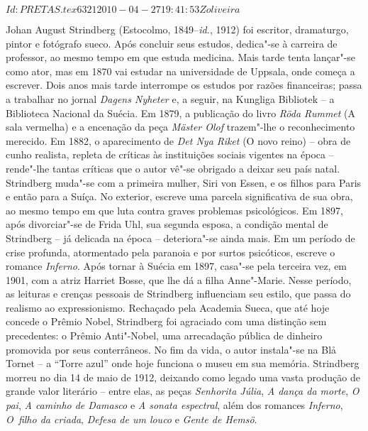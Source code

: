 \SVN $Id: PRETAS.tex 6321 2010-04-27 19:41:53Z oliveira $ 
\begin{resumopage}

\item[Johan August Strindberg] (Estocolmo, 1849--\textit{id.}, 1912) 
foi escritor, dramaturgo, pintor e fotógrafo sueco. Após concluir
seus estudos, dedica"-se à carreira de professor, ao mesmo tempo em que
estuda medicina. Mais tarde tenta lançar"-se como ator, mas em 1870 vai
estudar na universidade de Uppsala, onde começa a escrever. Dois anos
mais tarde interrompe os estudos por razões financeiras; passa a
trabalhar no jornal \textit{Dagens Nyheter} e, a seguir, na
Kungliga Bibliotek -- a Biblioteca Nacional da Suécia.
Em 1879, a publicação do livro \textit{Röda Rummet} (A sala vermelha) e
a encenação da peça \textit{Mäster Olof} trazem"-lhe o reconhecimento
merecido. Em 1882, o aparecimento de \textit{Det Nya Riket} (O novo
reino) -- obra de cunho realista, repleta de críticas às instituições
sociais vigentes na época -- rende"-lhe tantas críticas que o autor vê"-se
obrigado a deixar seu país natal. Strindberg muda"-se com a primeira
mulher, Siri von Essen, e os filhos para Paris e então para a Suíça. No
exterior, escreve uma parcela significativa de sua obra, ao mesmo tempo
em que luta contra graves problemas psicológicos. Em 1897, após
divorciar"-se de Frida Uhl, sua segunda esposa, a condição mental de
Strindberg -- já delicada na época -- deteriora"-se ainda mais. Em um
período de crise profunda, atormentado pela paranoia e por surtos
psicóticos, escreve o romance \textit{Inferno}. Após tornar à Suécia em
1897, casa"-se pela terceira vez, em 1901, com a atriz Harriet Bosse,
que lhe dá a filha Anne"-Marie. Nesse período, as leituras e crenças
pessoais de Strindberg influenciam seu estilo, que passa do realismo ao
expressionismo. Rechaçado pela Academia Sueca, que até 
hoje concede o Prêmio Nobel, Strindberg foi agraciado com uma 
distinção sem precedentes: o Prêmio Anti"-Nobel, uma arrecadação 
pública de dinheiro promovida por seus conterrâneos. 
No fim da vida, o autor instala"-se na Blå Tornet -- a “Torre azul” 
onde hoje funciona o museu em sua memória.
Strindberg morreu no dia 14 de maio de 1912, deixando como legado uma
vasta produção de grande valor literário -- entre elas, as peças
\textit{Senhorita Júlia}, \textit{A dança da morte}, \textit{O pai},
\textit{A caminho de Damasco} e \textit{A sonata espectral}, além dos
romances \textit{Inferno}, \textit{O~filho da criada}, \textit{Defesa
de um louco} e \textit{Gente de Hemsö}.


\end{resumopage}
